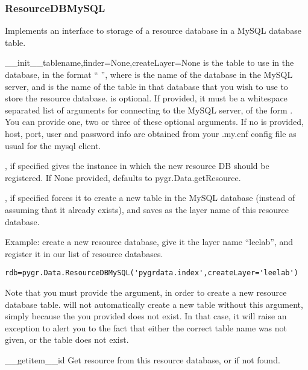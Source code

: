 \documentclass{howto}
\begin{document}
\subsubsection{ResourceDBMySQL}
Implements an interface to storage of a resource database in a MySQL
database table.
\begin{funcdesc}{__init__}{tablename,finder=None,createLayer=None}
   is the table to use in the database, in the format
  `` '', where  is the name of the
  database in the MySQL server, and  is the name of
  the table in that database that you wish to use to store the
  resource database.   is optional.
  If provided, it must be a whitespace separated 
  list of arguments for connecting to the MySQL server, of the form
    .  You can provide one, two
  or three of these optional arguments.
  If no  is provided, host, port, user and password info are obtained
  from your .my.cnf config file as usual for the mysql client.

  , if specified gives the  instance
  in which the new resource DB should be registered.  If None provided,
  defaults to pygr.Data.getResource.

  , if specified forces it to create a new table
  in the MySQL database (instead of assuming that it already exists),
  and saves  as the layer name of this resource database.

  Example: create a new resource database, give it the layer name ``leelab'',
  and register it in our list of resource databases.
\begin{verbatim}
rdb=pygr.Data.ResourceDBMySQL('pygrdata.index',createLayer='leelab')
\end{verbatim}
  Note that you must provide the  argument, in order to 
  create a new resource database table.   will not
  automatically create a new table without this argument, simply because the
   you provided does not exist.  In that case, it will
  raise an exception to alert you to the fact that either the correct table name
  was not given, or the table does not exist.
\end{funcdesc}

\begin{funcdesc}{__getitem__}{id}
  Get resource  from this resource database, or  
  if not found.
\end{funcdesc}
\end{document}
